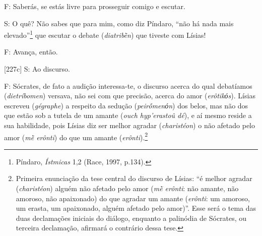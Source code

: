 F: Saberás, se estás livre para prosseguir comigo e escutar.

S: O quê? Não sabes que para mim, como diz Píndaro, ``não há nada mais
elevado''\footnote{Píndaro, \emph{Ístmicas} 1,2 (Race, 1997, p.134).}
que escutar o debate (\emph{diatribḕn}) que tiveste com Lísias!

F: Avança, então.

{[}227c{]} S: Ao discurso.

F: Sócrates, de fato a audição interessa-te, o discurso acerca do qual
debatíamos (\emph{dietríbomen}) versava, não sei com que precisão,
acerca do amor (\emph{erôtikόs}). Lísias escreveu (\emph{gégraphe}) a
respeito da sedução (\emph{peirṓmenόn}) dos belos, mas não dos que estão
sob a tutela de um amante (\emph{ouch hyp'erastoû dé}), e aí mesmo
reside a sua habilidade, pois Lísias diz ser melhor agradar
(\emph{charistéon}) o não afetado pelo amor (\emph{mḕ erônti}) do que um
amante (\emph{erônti}).\footnote{Primeira enunciação da tese central do
  discurso de Lísias: ``é melhor agradar (\emph{charistéon}) alguém não
  afetado pelo amor (\emph{mḕ erônti}: não amante, não amoroso, não
  apaixonado) do que agradar um amante (\emph{erônti}: um amoroso, um
  erasta, um apaixonado, alguém afetado pelo amor)''. Esse será o tema
  das duas declamações iniciais do diálogo, enquanto a palinódia de
  Sócrates, ou terceira declamação, afirmará o contrário dessa tese.}

